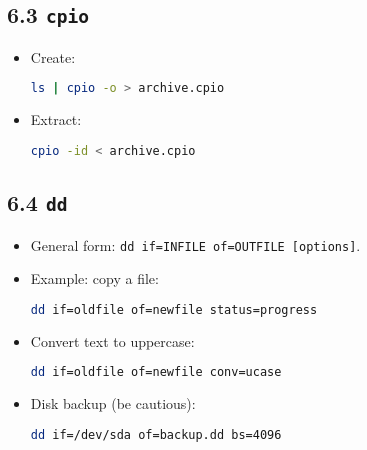 \documentclass[a4paper]{report}
\begin{document}
\subsection*{6.3 \texttt{cpio}}
\begin{itemize}
    \item Create:
\begin{lstlisting}[language=bash]
ls | cpio -o > archive.cpio
\end{lstlisting}
    \item Extract:
\begin{lstlisting}[language=bash]
cpio -id < archive.cpio
\end{lstlisting}
\end{itemize}

\subsection*{6.4 \texttt{dd}}
\begin{itemize}
    \item General form: \texttt{dd if=INFILE of=OUTFILE [options]}.
    \item Example: copy a file:
\begin{lstlisting}[language=bash]
dd if=oldfile of=newfile status=progress
\end{lstlisting}
    \item Convert text to uppercase:
\begin{lstlisting}[language=bash]
dd if=oldfile of=newfile conv=ucase
\end{lstlisting}
    \item Disk backup (be cautious):
\begin{lstlisting}[language=bash]
dd if=/dev/sda of=backup.dd bs=4096
\end{lstlisting}
\end{itemize}
\end{document}
